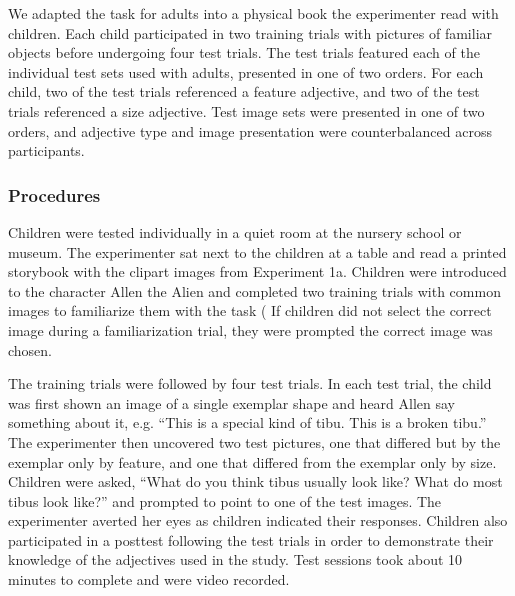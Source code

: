 \documentclass[10pt,letterpaper]{article}
\begin{document}
We adapted the task for adults into a physical book the experimenter read with children.  Each child participated in two training trials with pictures of familiar objects before undergoing four test trials.  The test trials featured each of the individual test sets used with adults, presented in one of two orders.  For each child, two of the test trials referenced a feature adjective, and two of the test trials referenced a size adjective.  Test image sets were presented in one of two orders, and adjective type and image presentation were counterbalanced across participants. 


\subsubsection{Procedures}

Children were tested individually in a quiet room at the nursery school or museum.  The experimenter sat next to the children at a table and read a printed storybook with the clipart images from Experiment 1a. Children were introduced to the character Allen the Alien and completed two training trials with common images to familiarize them with the task (%
If children did not select the correct image during a familiarization trial, they were prompted the correct image was chosen.

The training trials were followed by four test trials.  In each test trial, the child was first shown an image of a single exemplar shape and heard Allen say something about it, e.g. ``This is a special kind of tibu. This is a broken tibu.''  The experimenter then uncovered two test pictures, one that differed but by the exemplar only by feature, and one that differed from the exemplar only by size.  Children were asked, ``What do you think tibus usually look like? What do most tibus look like?'' and prompted to point to one of the test images.  The experimenter averted her eyes as children indicated their responses. 
Children also participated in a posttest following the test trials in order to demonstrate their knowledge of the adjectives used in the study.  Test sessions took about 10 minutes to complete and were video recorded.  
\end{document}
